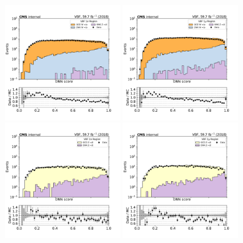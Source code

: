 \begin{figure}[htbp]
    \centering
    \includegraphics[width=0.45\textwidth]{VBFML/cr_1e_vbf_data_mc_particlenet_score_2018.pdf}
    \includegraphics[width=0.45\textwidth]{VBFML/cr_1m_vbf_data_mc_particlenet_score_2018.pdf} \\
    \includegraphics[width=0.45\textwidth]{VBFML/cr_2e_vbf_data_mc_particlenet_score_2018.pdf}
    \includegraphics[width=0.45\textwidth]{VBFML/cr_2m_vbf_data_mc_particlenet_score_2018.pdf}

\end{figure}

